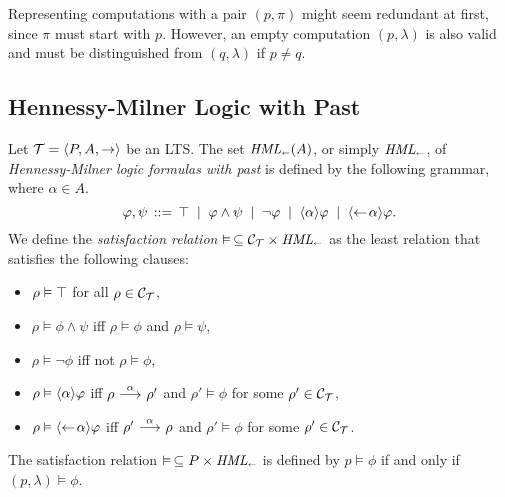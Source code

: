 \begin{remark}
    Representing computations with a pair $(p,\pi)$ might seem redundant at
    first, since $\pi$ must start with $p$. However, an empty computation
    $(p,\lambda)$ is also valid and must be distinguished from $(q,\lambda)$
    if $p\ne q$.
\end{remark}

\subsection{Hennessy-Milner Logic with Past}


\begin{definition}
    Let $\mathcal{T}=\langle P,A,\rightarrow \rangle$ be an LTS. The set $\textit{HML}_\shortleftarrow(A)$,
    or simply $\textit{HML}_\shortleftarrow$, of
    \emph{Hennessy-Milner logic formulas with past} is defined by the following grammar,
    where $\alpha\in A$.
    \[
        \varphi,\psi \,::=\, \top \;\;|\;\; \varphi\land\psi
                                \;\;|\;\; \neg\varphi
                                \;\;|\;\; \mbox{\ensuremath{\langle \alpha \rangle}} \varphi
                                \;\;|\;\; \mbox{\ensuremath{\langle\leftarrow\! \alpha \rangle}} \varphi.
    \]
    We define the \emph{satisfaction relation} $\vDash\,\subseteq \mathcal{C}_{\mathcal{T}} \times \textit{HML}_\shortleftarrow$
    as the least relation that satisfies the following clauses:
    \begin{itemize}
        \item $\rho\vDash\top$ for all $\rho\in\mathcal{C}_{\mathcal{T}}$,
        \item $\rho\vDash\phi\land\psi$ iff $\rho\vDash\phi$ and $\rho\vDash\psi$,
        \item $\rho\vDash\neg\phi$ iff not $\rho\vDash\phi$,
        \item $\rho\vDash\mbox{\ensuremath{\langle \alpha \rangle}}\varphi$ iff
              $\rho\ {\stackrel{{\alpha}}{\longrightarrow}}\ \rho'$ and $\rho'\vDash\phi$ for some $\rho'\in\mathcal{C}_{\mathcal{T}}$,
        \item $\rho\vDash\mbox{\ensuremath{\langle\leftarrow\! \alpha \rangle}}\varphi$ iff
              $\rho'\ {\stackrel{{\alpha}}{\longrightarrow}}\ \rho$ and $\rho'\vDash\phi$ for some $\rho'\in\mathcal{C}_{\mathcal{T}}$.
    \end{itemize}
    The satisfaction relation $\vDash\,\subseteq P\times\textit{HML}_\shortleftarrow$ is defined by
    $p\vDash\phi$ if and only if $(p,\lambda)\vDash \phi$.
\end{definition}


